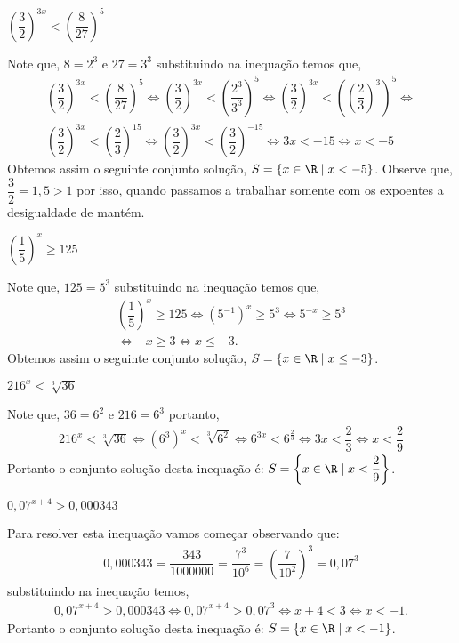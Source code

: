   \begin{exem}
  $\left( \dfrac{3}{2} \right)^{3x} < \left( \dfrac{8}{27} \right)^5$
  
  Note que, $8= 2^3$ e $27= 3^3$ substituindo na inequação temos que,
  \begin{eqnarray*}
  \left( \dfrac{3}{2} \right)^{3x} < \left( \dfrac{8}{27} \right)^5 \Leftrightarrow
  \left( \dfrac{3}{2} \right)^{3x} < \left( \dfrac{2^3}{3^3} \right)^5 \Leftrightarrow
  \left( \dfrac{3}{2} \right)^{3x} < \left(\left( \dfrac{2}{3}\right)^3 \right)^5 \Leftrightarrow \\
  \left( \dfrac{3}{2} \right)^{3x} < \left(\dfrac{2}{3} \right)^{15} \Leftrightarrow
  \left( \dfrac{3}{2} \right)^{3x} < \left(\dfrac{3}{2} \right)^{-15} \Leftrightarrow
   3x < -15 \Leftrightarrow x < -5
  \end{eqnarray*}
  Obtemos assim o seguinte conjunto solução, $S= \{x \in \R \mid x < -5 \}$.
  Observe que, $\dfrac{3}{2}= 1,5 > 1$ por isso, quando passamos a trabalhar somente com os expoentes a desigualdade de mantém.
  \end{exem}
  
  \begin{exem}
  $\left( \dfrac{1}{5} \right)^x \geq 125$
  
  Note que, $125= 5^3$ substituindo na inequação temos que,
  \begin{eqnarray*}
  \left( \dfrac{1}{5} \right)^x \geq 125 \Leftrightarrow
  \left( 5^{-1} \right)^x \geq 5^3 \Leftrightarrow
  5^{-x} \geq 5^3 \\
  \Leftrightarrow -x \geq 3 \Leftrightarrow x \leq -3.
  \end{eqnarray*}
  Obtemos assim o seguinte conjunto solução, $S= \{x \in \R \mid x \leq -3 \}$.
  \end{exem}
  
  \begin{exem}
  $216^x < \sqrt[3]{36}$
  
  Note que, $36= 6^2$ e $216= 6^3$ portanto,
  \begin{eqnarray*}
  216^x < \sqrt[3]{36} \Leftrightarrow (6^3)^x < \sqrt[3]{6^2} \Leftrightarrow 
  6^{3x} < 6^{\frac{2}{3}}  \Leftrightarrow 3x < \dfrac{2}{3} \Leftrightarrow 
  x < \dfrac{2}{9}
  \end{eqnarray*}
  Portanto o conjunto solução desta inequação é: $S= \left\{x \in \R \mid x < \dfrac{2}{9} \right\}$.
  \end{exem}
  
  \begin{exem}
  $0,07^{x+4} > 0,000343$
  
  Para resolver esta inequação vamos começar observando que:
  \begin{eqnarray*}
  0,000343= \dfrac{343}{1000000}= \dfrac{7^3}{10^6}= \left(\dfrac{7}{10^2}\right)^3= 0,07^3
  \end{eqnarray*}
  substituindo na inequação temos,
  \begin{eqnarray*}
  0,07^{x+4} > 0,000343 \Leftrightarrow 0,07^{x+4} > 0,07^3 \Leftrightarrow x+4 < 3 \Leftrightarrow x < -1.
  \end{eqnarray*}
  Portanto o conjunto solução desta inequação é: $S= \{x \in \R \mid x < -1 \}$.
  \end{exem}
  
